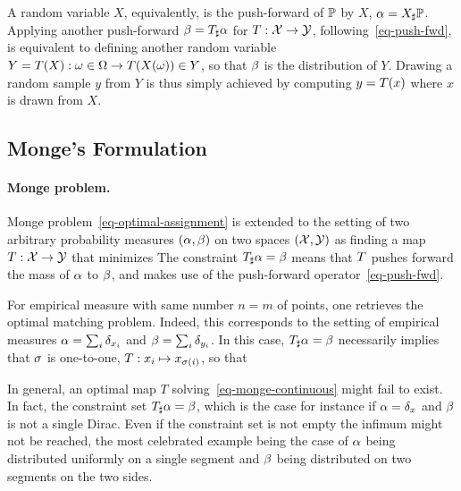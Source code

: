 \begin{rem}
A random variable $X$, equivalently, is the push-forward of $\mathbb{P}$ by $X$, $\alpha=X_\sharp\mathbb{P}$.
%
Applying another push-forward $\beta = T_\sharp\alpha$ for $T : \mathcal{X} \rightarrow \mathcal{Y}$, following~\eqref{eq-push-fwd}, is equivalent to defining another random variable $Y=T(X) : \omega \in \Omega \rightarrow T(X(\omega)) \in Y$, so that $\beta$ is the distribution of $Y$.
%
Drawing a random sample $y$ from $Y$ is thus simply achieved by computing $y=T(x)$ where $x$ is drawn from $X$. 
\end{rem}


\subsection{Monge's Formulation}


\paragraph{Monge problem.}

Monge problem~\eqref{eq-optimal-assignment} is extended to the setting of two arbitrary probability measures $(\alpha,\beta)$ on two spaces $(\mathcal{X},\mathcal{Y})$ as finding a map $T : \mathcal{X} \rightarrow \mathcal{Y}$ that minimizes
The constraint $T_\sharp \alpha = \beta$ means that $T$ pushes forward the mass of $\alpha$ to $\beta$, and makes use of the push-forward operator~\eqref{eq-push-fwd}. 

For empirical measure with same number $n=m$ of points, one retrieves the optimal matching problem. Indeed, this corresponds to the setting of empirical measures $\alpha=\sum_i \delta_{x_i}$ and $\beta=\sum_i \delta_{y_i}$.  In this case, $T_\sharp \alpha=\beta$ necessarily implies that $\sigma$ is one-to-one, $T : x_i \mapsto x_{\sigma(i)}$, so that 

In general, an optimal map $T$ solving~\eqref{eq-monge-continuous} might fail to exist. In fact, the constraint set $T_\sharp \alpha = \beta$, which is the case for instance if $\alpha=\delta_x$ and $\beta$ is not a single Dirac. 
%
Even if the constraint set is not empty the infimum might not be reached, the most celebrated example being the case of $\alpha$ being distributed uniformly on a single segment and $\beta$ being distributed on two segments on the two sides.



